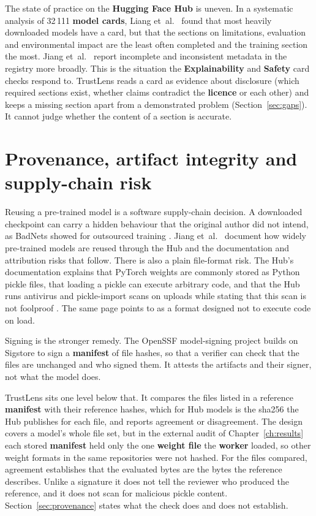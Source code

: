 The state of practice on the \textbf{Hugging Face Hub} is uneven. In a systematic analysis of 32\,111 \textbf{model cards}, Liang et~al.\ \cite{liang2024cards} found that most heavily downloaded models have a card, but that the sections on limitations, evaluation and environmental impact are the least often completed and the training section the most. Jiang et~al.\ \cite{jiang2023reuse} report incomplete and inconsistent metadata in the registry more broadly. This is the situation the \textbf{Explainability} and \textbf{Safety} card checks respond to. TrustLens reads a card as evidence about disclosure (which required sections exist, whether claims contradict the \textbf{licence} or each other) and keeps a missing section apart from a demonstrated problem (Section~\ref{sec:gaps}). It cannot judge whether the content of a section is accurate.

\section{Provenance, artifact integrity and supply-chain risk}
Reusing a pre-trained model is a software supply-chain decision. A downloaded checkpoint can carry a hidden behaviour that the original author did not intend, as BadNets showed for outsourced training \cite{gu2017badnets}. Jiang et~al.\ \cite{jiang2023reuse} document how widely pre-trained models are reused through the Hub and the documentation and attribution risks that follow. There is also a plain file-format risk. The Hub's documentation explains that PyTorch weights are commonly stored as Python pickle files, that loading a pickle can execute arbitrary code, and that the Hub runs antivirus and pickle-import scans on uploads while stating that this scan is not foolproof \cite{hfpickle}. The same page points to  as a format designed not to execute code on load.

Signing is the stronger remedy. The OpenSSF model-signing project builds on Sigstore \cite{sigstoremodel} to sign a \textbf{manifest} of file hashes, so that a verifier can check that the files are unchanged and who signed them. It attests the artifacts and their signer, not what the model does.

TrustLens sits one level below that. It compares the files listed in a reference \textbf{manifest} with their reference hashes, which for Hub models is the sha256 the Hub publishes for each file, and reports agreement or disagreement. The design covers a model's whole file set, but in the external audit of Chapter~\ref{ch:results} each stored \textbf{manifest} held only the one \textbf{weight file} the \textbf{worker} loaded, so other weight formats in the same repositories were not hashed. For the files compared, agreement establishes that the evaluated bytes are the bytes the reference describes. Unlike a signature it does not tell the reviewer who produced the reference, and it does not scan for malicious pickle content. Section~\ref{sec:provenance} states what the check does and does not establish.

